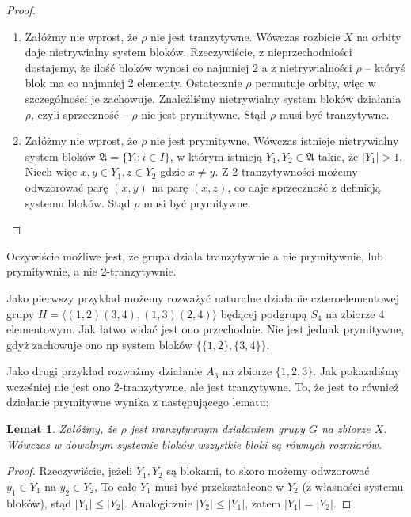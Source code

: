 \documentclass[licencjacka]{pracamgr}
\newtheorem{lemma}{Lemat}[section]
\begin{document}
\begin{proof}%
	\begin{enumerate}[label=Ad \alph*)] 
	 \item 	Załóżmy nie wprost, że $\rho$ nie jest tranzytywne. 
					Wówczas rozbicie $X$ na orbity daje nietrywialny system bloków.
					Rzeczywiście, z nieprzechodniości dostajemy, że ilość bloków wynosi co najmniej 2 a
					z nietrywialności $\rho$ -- któryś blok ma co najmniej 2 elementy.
					Ostatecznie $\rho$ permutuje orbity, więc w szczególności je zachowuje.
					Znaleźliśmy nietrywialny system bloków działania $\rho$, czyli sprzeczność -- $\rho$ nie jest prymitywne.
					Stąd $\rho$ musi być tranzytywne.
	 \item 	Załóżmy nie wprost, że $\rho$ nie jest prymitywne.
					Wówczas istnieje nietrywialny system bloków $\mathfrak{A} = \{Y_i \colon i \in I \}$, 
					w którym istnieją $Y_1, Y_2 \in \mathfrak{A}$ takie, że $|Y_1| > 1$.
					Niech więc $x,y \in Y_1, z \in Y_2$ gdzie $x \ne y$.
					Z 2-tranzytywności możemy odwzorować parę $(x, y)$ na parę $(x, z)$, co daje sprzeczność z definicją systemu bloków.
					Stąd $\rho$ musi być prymitywne.
	\end{enumerate}
\end{proof}

Oczywiście możliwe jest, że grupa działa tranzytywnie a nie prymitywnie, lub prymitywnie, a nie 2-tranzytywnie.

Jako pierwszy przykład możemy rozważyć naturalne działanie czteroelementowej 
grupy $H= \langle (1,2)(3,4), (1,3)(2,4) \rangle$ będącej podgrupą $S_4$ na zbiorze 4 elementowym.
Jak łatwo widać jest ono przechodnie.
Nie jest jednak prymitywne, gdyż zachowuje ono np system bloków $\{\{1,2\}, \{3,4\}\}$.

Jako drugi przykład rozważmy działanie $A_3$ na zbiorze $\{1, 2, 3\}$.
Jak pokazaliśmy wcześniej nie jest ono 2-tranzytywne, ale jest tranzytywne.
To, że jest to również działanie prymitywne wynika z następującego lematu:

\begin{lemma}
	Załóżmy, że $\rho$ jest tranzytywnym działaniem grupy $G$ na zbiorze $X$.
	Wówczas w dowolnym systemie bloków wszystkie bloki są równych rozmiarów.
\end{lemma}
\begin{proof}
Rzeczywiście, jeżeli $Y_1, Y_2$ są blokami, to skoro możemy odwzorować $y_1 \in Y_1$ na $y_2 \in Y_2$, 
To całe $Y_1$ musi być przekształcone w $Y_2$ (z własności systemu bloków), stąd $|Y_1| \le |Y_2|$.
Analogicznie $|Y_2| \le |Y_1|$, zatem $|Y_1| = |Y_2|$.
\end{proof}
\end{document}
